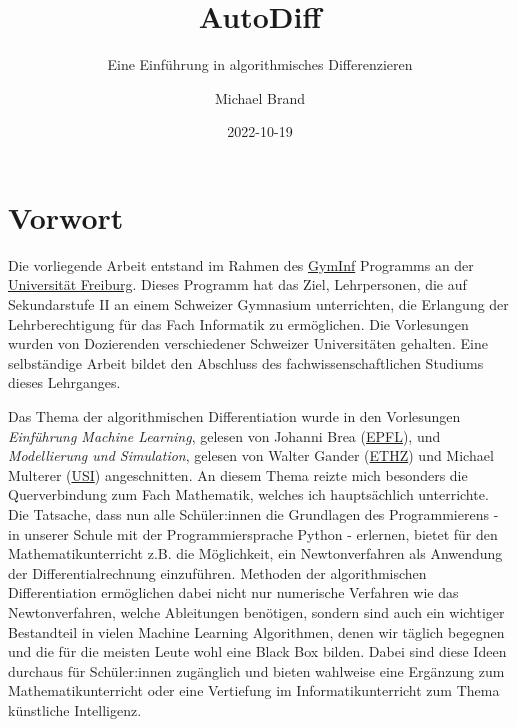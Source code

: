 \documentclass[
  a4paper,
  DIV=11]{scrreprt}
\title{AutoDiff}
\subtitle{Eine Einführung in algorithmisches Differenzieren}
\author{Michael Brand}
\date{2022-10-19}
\renewcommand*\contentsname{Inhaltsverzeichnis}
\newcommand\contentsname{Inhaltsverzeichnis}
\theoremstyle{definition}
\theoremstyle{definition}
\theoremstyle{remark}
\begin{document}
\maketitle
\ifdefined\Shaded\renewenvironment{Shaded}{\begin{tcolorbox}[breakable, boxrule=0pt, borderline west={3pt}{0pt}{shadecolor}, interior hidden, frame hidden, sharp corners, enhanced]}{\end{tcolorbox}}\fi

\renewcommand*\contentsname{Inhaltsverzeichnis}
{
\hypersetup{linkcolor=}
\setcounter{tocdepth}{2}
\tableofcontents
}

\hypertarget{vorwort}{%
\chapter*{Vorwort}\label{vorwort}}


Die vorliegende Arbeit entstand im Rahmen des
\href{https://www.unifr.ch/gyminf/de/}{GymInf} Programms an der
\href{https://www.unifr.ch/home/de/}{Universität Freiburg}. Dieses
Programm hat das Ziel, Lehrpersonen, die auf Sekundarstufe II an einem
Schweizer Gymnasium unterrichten, die Erlangung der Lehrberechtigung für
das Fach Informatik zu ermöglichen. Die Vorlesungen wurden von
Dozierenden verschiedener Schweizer Universitäten gehalten. Eine
selbständige Arbeit bildet den Abschluss des fachwissenschaftlichen
Studiums dieses Lehrganges.

Das Thema der algorithmischen Differentiation wurde in den Vorlesungen
\emph{Einführung Machine Learning}, gelesen von Johanni Brea
(\href{https://people.epfl.ch/johanni.brea}{EPFL}), und
\emph{Modellierung und Simulation}, gelesen von Walter Gander
(\href{https://people.inf.ethz.ch/gander/}{ETHZ}) und Michael Multerer
(\href{https://search.usi.ch/en/people/339699228dd35e95e8bb3c002edca90f/multerer-michael}{USI})
angeschnitten. An diesem Thema reizte mich besonders die Querverbindung
zum Fach Mathematik, welches ich hauptsächlich unterrichte. Die
Tatsache, dass nun alle Schüler:innen die Grundlagen des Programmierens
- in unserer Schule mit der Programmiersprache Python - erlernen, bietet
für den Mathematikunterricht z.B. die Möglichkeit, ein Newtonverfahren
als Anwendung der Differentialrechnung einzuführen. Methoden der
algorithmischen Differentiation ermöglichen dabei nicht nur numerische
Verfahren wie das Newtonverfahren, welche Ableitungen benötigen, sondern
sind auch ein wichtiger Bestandteil in vielen Machine Learning
Algorithmen, denen wir täglich begegnen und die für die meisten Leute
wohl eine Black Box bilden. Dabei sind diese Ideen durchaus für
Schüler:innen zugänglich und bieten wahlweise eine Ergänzung zum
Mathematikunterricht oder eine Vertiefung im Informatikunterricht zum
Thema künstliche Intelligenz.
\end{document}
